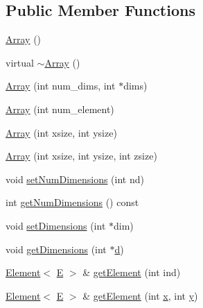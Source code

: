 \subsection*{Public Member Functions}
\begin{DoxyCompactItemize}
\item 
\mbox{\hyperlink{classbridges_1_1_array_a958421b86ff55303b5fc7d505109f9fe}{Array}} ()
\item 
virtual \mbox{\hyperlink{classbridges_1_1_array_aa80b2d2ebc4c27e74a8eaaeb6907b474}{$\sim$\+Array}} ()
\item 
\mbox{\hyperlink{classbridges_1_1_array_a25ff771f9ba7f365465f309ed2dd3688}{Array}} (int num\+\_\+dims, int $\ast$dims)
\item 
\mbox{\hyperlink{classbridges_1_1_array_a859819bc374aa90fcd84b1314034fbbf}{Array}} (int num\+\_\+element)
\item 
\mbox{\hyperlink{classbridges_1_1_array_a13b26fc4d2ccb19b277b2acc615efce2}{Array}} (int xsize, int ysize)
\item 
\mbox{\hyperlink{classbridges_1_1_array_a3504e71cacffd343edf8b9ea16f75eb4}{Array}} (int xsize, int ysize, int zsize)
\item 
void \mbox{\hyperlink{classbridges_1_1_array_a6b91612bb7b89a563571fd1ea417ef2a}{set\+Num\+Dimensions}} (int nd)
\item 
int \mbox{\hyperlink{classbridges_1_1_array_a31edfcff05dd4102fee1840ee915319e}{get\+Num\+Dimensions}} () const
\item 
void \mbox{\hyperlink{classbridges_1_1_array_a4e179915ab7820bbafe9b3433656b182}{set\+Dimensions}} (int $\ast$dim)
\item 
void \mbox{\hyperlink{classbridges_1_1_array_ae195a6f06157e82c68483ff636e30f5e}{get\+Dimensions}} (int $\ast$\mbox{\hyperlink{namespacebridges_acfb0a4f7877d8f63de3e6862004c50eda8277e0910d750195b448797616e091ad}{d}})
\item 
\mbox{\hyperlink{classbridges_1_1_element}{Element}}$<$ \mbox{\hyperlink{namespacebridges_acfb0a4f7877d8f63de3e6862004c50eda3a3ea00cfc35332cedf6e5e9a32e94da}{E}} $>$ \& \mbox{\hyperlink{classbridges_1_1_array_ac5ff703692153e1831cbea6edd3007e7}{get\+Element}} (int ind)
\item 
\mbox{\hyperlink{classbridges_1_1_element}{Element}}$<$ \mbox{\hyperlink{namespacebridges_acfb0a4f7877d8f63de3e6862004c50eda3a3ea00cfc35332cedf6e5e9a32e94da}{E}} $>$ \& \mbox{\hyperlink{classbridges_1_1_array_acd5e730e0369b1fa699a5907e889f213}{get\+Element}} (int \mbox{\hyperlink{namespacebridges_acfb0a4f7877d8f63de3e6862004c50eda9dd4e461268c8034f5c8564e155c67a6}{x}}, int \mbox{\hyperlink{namespacebridges_acfb0a4f7877d8f63de3e6862004c50eda415290769594460e2e485922904f345d}{y}})

\end{DoxyCompactItemize}

